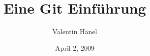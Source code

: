 \documentclass{beamer}
\author{Valentin H\"anel}
\institute{Bernstein Center for Computational Neuroscience Berlin}
\title{Eine Git Einführung}
\date{April 2, 2009}
\begin{document}

\begin{frame}
	\titlepage
\end{frame}


\end{document}
